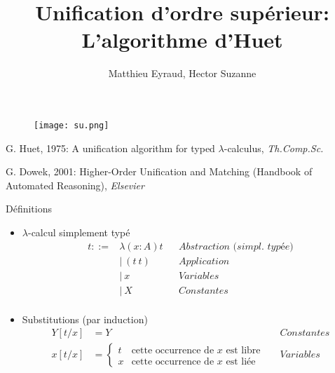 \documentclass{beamer}
\begin{document}
\begin{frame}
\begin{figure}[h]
    \centering
    \texttt{[image: su.png]}%
\end{figure}
\title[Rapport]{Unification d'ordre supérieur: L'algorithme d'Huet}





\author{ Matthieu Eyraud, Hector Suzanne }%

\titlepage %

G. Huet, 1975: A unification algorithm for typed $\lambda$-calculus, \emph{Th.Comp.Sc.}

G. Dowek, 2001: Higher-Order Unification and Matching (Handbook of Automated Reasoning), \emph{Elsevier}


\end{frame}

\begin{frame}{Définitions}
\begin{itemize}
    \item $\lambda$-calcul simplement typé
        \begin{align*}
            t ::= & \lambda(x : A) t & & \textit{Abstraction (simpl. typée)} \\
            &|\ (t\ t) & & \textit{Application} \\
            &|\ x  & & \textit{Variables} \\
            &|\ X & & \textit{Constantes} \\
        \end{align*}
    \item Substitutions (par induction)
        \begin{align*}
            Y[t/x] &= Y & & \textit{Constantes} \\
            x[t/x] &=
                \begin{cases}
                    t & \text{cette occurrence de $x$ est libre} \\
                    x & \text{cette occurrence de $x$ est liée}
                \end{cases}
                & & \textit{Variables}
        \end{align*}
\end{itemize}
\end{frame}
\end{document}
